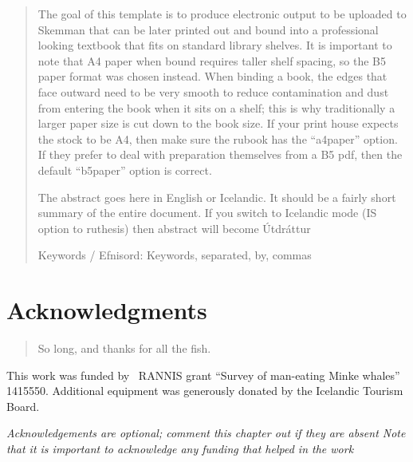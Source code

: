 \documentclass[showtrims]{rubook}
\begin{document}
\begin{abstract}
  The goal of this template is to produce electronic output to be uploaded to Skemman that can be later printed out and bound into a professional looking textbook that fits on standard library shelves.
  It is important to note that A4 paper when bound requires taller shelf spacing, so the B5 paper format was chosen instead.
  When binding a book, the edges that face outward need to be very smooth to reduce contamination and dust from entering the book when it sits on a shelf; this is why traditionally a larger paper size is cut down to the book size.
  If your print house expects the stock to be A4, then make sure the rubook has the ``a4paper'' option.
  If they prefer to deal with preparation themselves from a B5 pdf, then the default ``b5paper'' option is correct.
  
  
  The abstract goes here in English or Icelandic.
  It should be a fairly short summary of the entire document.
  If you switch to Icelandic mode (IS option to ruthesis) then abstract will become \'{U}tdr\'{a}ttur

  Keywords / Efnisord:  Keywords, separated, by, commas
\end{abstract}


\chapter*{Acknowledgments} 
\begin{quotation}
So long, and thanks for all the fish.
\end{quotation}
\vspace{\baselineskip}

This work was funded by \the\year~RANNIS grant ``Survey of man-eating Minke whales'' 1415550.
Additional equipment was generously donated by the Icelandic Tourism Board.

{\em Acknowledgements are optional; comment this chapter out if they are absent
  Note that it is important to acknowledge any funding that helped in the work\/}
\clearpage{}

\mainmatter{}

\end{document}
